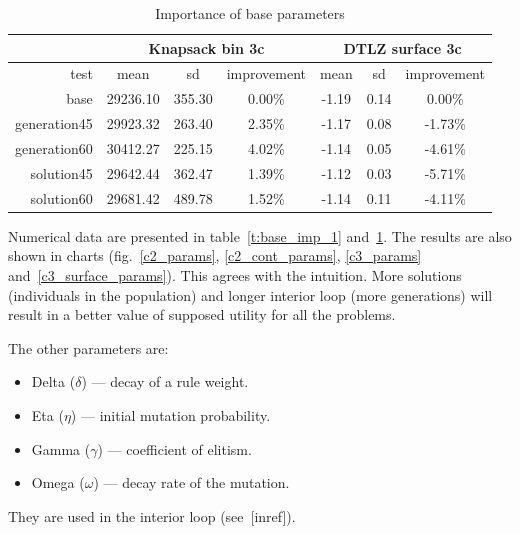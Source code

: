 \begin{table}
  \centering
  \begin{tabular}{r c c c c c c}
    & \multicolumn{3}{c}{Knapsack bin 3c} & \multicolumn{3}{c}{DTLZ surface 3c} \\
    \hline
    test & mean & sd & improvement & mean & sd & improvement \\
    \hline
    \hline
    base & 29236.10 & 355.30 & 0.00\% & -1.19 & 0.14 & 0.00\% \\
    generation45 & 29923.32 & 263.40 & 2.35\% & -1.17 & 0.08 & -1.73\% \\
    generation60 & 30412.27 & 225.15 & 4.02\% & -1.14 & 0.05 & -4.61\% \\
    solution45 & 29642.44 & 362.47 & 1.39\% & -1.12 & 0.03 & -5.71\% \\
    solution60 & 29681.42 & 489.78 & 1.52\% & -1.14 & 0.11 & -4.11\% \\
    \hline
  \end{tabular}
  \caption{Importance of base parameters}
  \label{t:base_imp_2}
\end{table}


Numerical data are presented in table~\ref{t:base_imp_1}
and~\ref{t:base_imp_2}. The results are also shown in charts
(fig.~\ref{c2_params}, \ref{c2_cont_params}, \ref{c3_params}
and~\ref{c3_surface_params}). This agrees with the intuition. More solutions
(individuals in the population) and longer interior loop (more generations)
will result in a better value of supposed utility for all the
problems.

The other parameters are:
\begin{itemize}
\item Delta ($\delta$) --- decay of a rule weight.
\item Eta ($\eta$) --- initial mutation probability.
\item Gamma ($\gamma$) --- coefficient of elitism.
\item Omega ($\omega$) --- decay rate of the mutation.
\end{itemize}

They are used in the interior loop (see~[inref]).


